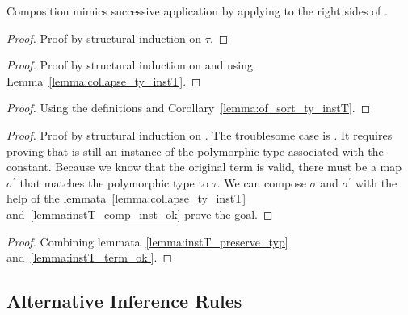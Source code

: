 Composition mimics successive application by applying  to the right sides of .

\begin{lemma}
\end{lemma}
\begin{proof}
    Proof by structural induction on \(\tau\).
\end{proof}

\begin{lemma}
\end{lemma}
\begin{proof}
    Proof by structural induction on  and using Lemma~\ref{lemma:collapse_ty_instT}.
\end{proof}

\begin{lemma}
\end{lemma}
\begin{proof}
    Using the definitions and Corollary~\ref{lemma:of_sort_ty_instT}.
\end{proof}

\begin{theorem}
\end{theorem}
\begin{proof}
    Proof by structural induction on .
    The troublesome case is .
    It requires proving that  is still an instance of the polymorphic type associated with the constant.
    Because we know that the original term is valid, there must be a map \(\sigma^\prime\) that matches the polymorphic type to \(\tau\).
    We can compose \(\sigma\) and \(\sigma^\prime\) with the help of the lemmata~\ref{lemma:collapse_ty_instT} and~\ref{lemma:instT_comp_inst_ok} prove the goal.
\end{proof}


\begin{corollary}
\end{corollary}
\begin{proof}
    Combining lemmata~\ref{lemma:instT_preserve_typ} and~\ref{lemma:instT_term_ok'}.
\end{proof}

\subsection{Alternative Inference Rules}

